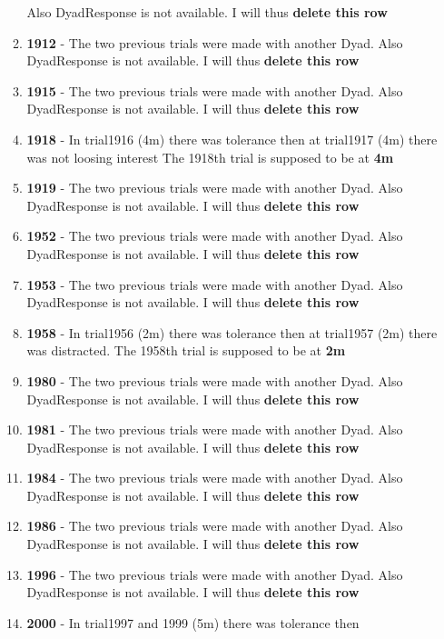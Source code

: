 \documentclass[
]{article}
\begin{document}
\begin{itemize}
\begin{enumerate}
    Also DyadResponse is not available. I will thus \textbf{delete this
    row}
  \item
    \textbf{1912} - The two previous trials were made with another Dyad.
    Also DyadResponse is not available. I will thus \textbf{delete this
    row}
  \item
    \textbf{1915} - The two previous trials were made with another Dyad.
    Also DyadResponse is not available. I will thus \textbf{delete this
    row}
  \item
    \textbf{1918} - In trial1916 (4m) there was tolerance then at
    trial1917 (4m) there was not loosing interest The 1918th trial is
    supposed to be at \textbf{4m}
  \item
    \textbf{1919} - The two previous trials were made with another Dyad.
    Also DyadResponse is not available. I will thus \textbf{delete this
    row}
  \item
    \textbf{1952} - The two previous trials were made with another Dyad.
    Also DyadResponse is not available. I will thus \textbf{delete this
    row}
  \item
    \textbf{1953} - The two previous trials were made with another Dyad.
    Also DyadResponse is not available. I will thus \textbf{delete this
    row}
  \item
    \textbf{1958} - In trial1956 (2m) there was tolerance then at
    trial1957 (2m) there was distracted. The 1958th trial is supposed to
    be at \textbf{2m}
  \item
    \textbf{1980} - The two previous trials were made with another Dyad.
    Also DyadResponse is not available. I will thus \textbf{delete this
    row}
  \item
    \textbf{1981} - The two previous trials were made with another Dyad.
    Also DyadResponse is not available. I will thus \textbf{delete this
    row}
  \item
    \textbf{1984} - The two previous trials were made with another Dyad.
    Also DyadResponse is not available. I will thus \textbf{delete this
    row}
  \item
    \textbf{1986} - The two previous trials were made with another Dyad.
    Also DyadResponse is not available. I will thus \textbf{delete this
    row}
  \item
    \textbf{1996} - The two previous trials were made with another Dyad.
    Also DyadResponse is not available. I will thus \textbf{delete this
    row}
  \item
    \textbf{2000} - In trial1997 and 1999 (5m) there was tolerance then

\end{enumerate}
\end{itemize}
\end{document}

